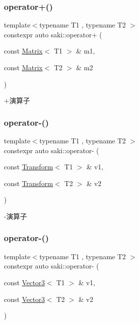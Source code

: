 \subsubsection{\texorpdfstring{operator+()}{operator+()}\hspace{0.1cm}{\footnotesize\ttfamily [5/5]}}
{\footnotesize\ttfamily template$<$typename T1 , typename T2 $>$ \\
constexpr auto saki\+::operator+ (\begin{DoxyParamCaption}\item[{const \mbox{\hyperlink{classsaki_1_1_matrix}{Matrix}}$<$ T1 $>$ \&}]{m1,  }\item[{const \mbox{\hyperlink{classsaki_1_1_matrix}{Matrix}}$<$ T2 $>$ \&}]{m2 }\end{DoxyParamCaption})}



+演算子 

\mbox{\label{namespacesaki_a0efe115a634ca1910687617aa064f285}} 
\subsubsection{\texorpdfstring{operator-\/()}{operator-()}\hspace{0.1cm}{\footnotesize\ttfamily [1/5]}}
{\footnotesize\ttfamily template$<$typename T1 , typename T2 $>$ \\
constexpr auto saki\+::operator-\/ (\begin{DoxyParamCaption}\item[{const \mbox{\hyperlink{classsaki_1_1_transform}{Transform}}$<$ T1 $>$ \&}]{v1,  }\item[{const \mbox{\hyperlink{classsaki_1_1_transform}{Transform}}$<$ T2 $>$ \&}]{v2 }\end{DoxyParamCaption})}



-\/演算子 

\mbox{\label{namespacesaki_ab4e324d1879fdeb0737196f18a3b42e2}} 
\subsubsection{\texorpdfstring{operator-\/()}{operator-()}\hspace{0.1cm}{\footnotesize\ttfamily [2/5]}}
{\footnotesize\ttfamily template$<$typename T1 , typename T2 $>$ \\
constexpr auto saki\+::operator-\/ (\begin{DoxyParamCaption}\item[{const \mbox{\hyperlink{classsaki_1_1_vector3}{Vector3}}$<$ T1 $>$ \&}]{v1,  }\item[{const \mbox{\hyperlink{classsaki_1_1_vector3}{Vector3}}$<$ T2 $>$ \&}]{v2 }\end{DoxyParamCaption})}



